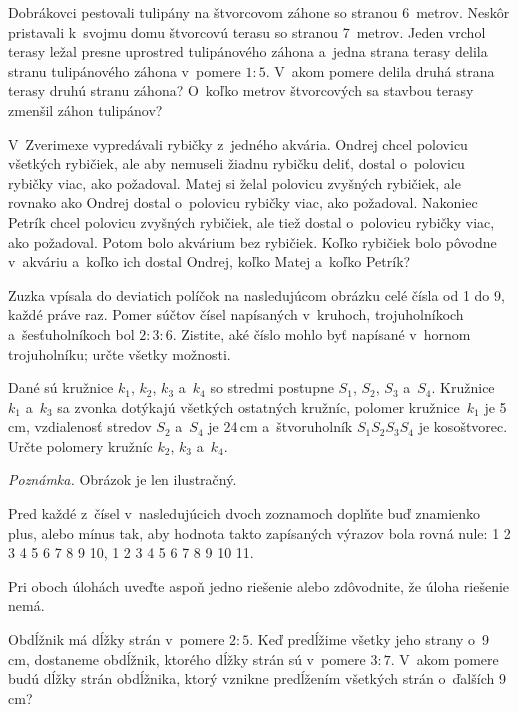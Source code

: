 {%
Dobrákovci pestovali tulipány na štvorcovom záhone so stranou 6~metrov.
Neskôr pristavali k~svojmu domu štvorcovú terasu so stranou 7~metrov.
Jeden vrchol terasy ležal presne uprostred tulipánového záhona a~jedna strana terasy delila stranu tulipánového záhona v~pomere $1:5$.
V~akom pomere delila druhá strana terasy druhú stranu záhona?
O~koľko metrov štvorcových sa stavbou terasy zmenšil záhon tulipánov?
}

{%
V~Zverimexe vypredávali rybičky z~jedného akvária.
Ondrej chcel polovicu všetkých rybičiek, ale aby nemuseli žiadnu rybičku deliť, dostal o~polovicu rybičky viac, ako požadoval.
Matej si želal polovicu zvyšných rybičiek, ale rovnako ako Ondrej dostal o~polovicu rybičky viac, ako požadoval.
Nakoniec Petrík chcel polovicu zvyšných rybičiek, ale tiež dostal o~polovicu rybičky viac, ako požadoval.
Potom bolo akvárium bez rybičiek. Koľko rybičiek bolo pôvodne v~akváriu a~koľko ich dostal Ondrej, koľko Matej a~koľko Petrík?
}

{%
Zuzka vpísala do deviatich políčok na nasledujúcom obrázku celé čísla od 1 do 9, každé práve raz.
Pomer súčtov čísel napísaných v~kruhoch, trojuholníkoch a~šesťuholníkoch bol $2:3:6$.
Zistite, aké číslo mohlo byť napísané v~hornom trojuholníku; určte všetky možnosti.
\ifobrazkyvedla\else{}\fi
}

{%
Dané sú kružnice $k_1$, $k_2$, $k_3$ a~$k_4$ so stredmi postupne $S_1$, $S_2$, $S_3$ a~$S_4$.
Kružnice $k_1$ a~$k_3$ sa zvonka dotýkajú všetkých ostatných kružníc, polomer kružnice~$k_1$ je 5\,cm, vzdialenosť stredov $S_2$ a~$S_4$ je 24\,cm a~štvoruholník $S_1S_2S_3S_4$ je kosoštvorec.
Určte polomery kružníc $k_2$, $k_3$ a~$k_4$.

{\it Poznámka.}
Obrázok je len ilustračný.
\ifobrazkyvedla\else{}\fi
}

{%
Pred každé z~čísel v~nasledujúcich dvoch zoznamoch doplňte buď znamienko plus, alebo mínus tak, aby hodnota takto zapísaných výrazov bola rovná nule:
{} 1 2 3 4 5 6 7 8 9 10,
 1 2 3 4 5 6 7 8 9 10 11.

Pri oboch úlohách uveďte aspoň jedno riešenie alebo zdôvodnite, že úloha riešenie nemá.
}

{%
Obdĺžnik má dĺžky strán v~pomere $2:5$.
Keď predĺžime všetky jeho strany o~9\,cm, dostaneme obdĺžnik, ktorého dĺžky strán sú v~pomere $3:7$.
V~akom pomere budú dĺžky strán obdĺžnika, ktorý vznikne predĺžením všetkých strán o~ďalších 9\,cm?
}

